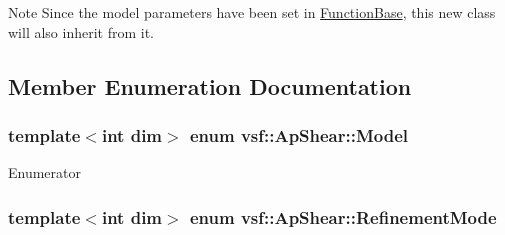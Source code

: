 \begin{DoxyNote}{Note}
Since the model parameters have been set in \hyperlink{classvsf_1_1FunctionBase}{Function\-Base}, this new class will also inherit from it. 
\end{DoxyNote}


\subsection{Member Enumeration Documentation}
\hypertarget{classvsf_1_1ApShear_a354ce33d5e60761e975bdb924119354d}{
\subsubsection[{Model}]{\setlength{\rightskip}{0pt plus 5cm}template$<$int dim$>$ enum {\bf vsf\-::\-Ap\-Shear\-::\-Model}}}\label{classvsf_1_1ApShear_a354ce33d5e60761e975bdb924119354d}
\begin{Desc}
\item[Enumerator]\par
\begin{description}
\item[{\em 
\hypertarget{classvsf_1_1ApShear_a354ce33d5e60761e975bdb924119354dab1d7d25f092b95270851c3cf1faa7bb5}{turcotte}\label{classvsf_1_1ApShear_a354ce33d5e60761e975bdb924119354dab1d7d25f092b95270851c3cf1faa7bb5}
}]\item[{\em 
\hypertarget{classvsf_1_1ApShear_a354ce33d5e60761e975bdb924119354da218f8a8439447f9d74a62070ad9086dc}{savage}\label{classvsf_1_1ApShear_a354ce33d5e60761e975bdb924119354da218f8a8439447f9d74a62070ad9086dc}
}]\end{description}
\end{Desc}
\hypertarget{classvsf_1_1ApShear_aef8049bf5f942237a19e8b88ddc19e8c}{
\subsubsection[{Refinement\-Mode}]{\setlength{\rightskip}{0pt plus 5cm}template$<$int dim$>$ enum {\bf vsf\-::\-Ap\-Shear\-::\-Refinement\-Mode}}}\label{classvsf_1_1ApShear_aef8049bf5f942237a19e8b88ddc19e8c}
